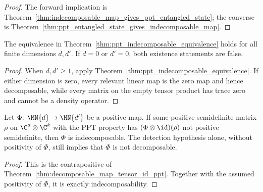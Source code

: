\begin{proof}
    \leanok
    The forward implication is
    Theorem~\ref{thm:indecomposable_map_gives_ppt_entangled_state}; the
    converse is
    Theorem~\ref{thm:ppt_entangled_state_gives_indecomposable_map}.
\end{proof}

\begin{theorem}
    \label{thm:ppt_indecomposable_equivalence_all_dimensions}
    \leanok
    The equivalence in
    Theorem~\ref{thm:ppt_indecomposable_equivalence} holds for all finite
    dimensions $d,d'$. If $d=0$ or $d'=0$, both existence statements are
    false.
\end{theorem}

\begin{proof}
    \leanok
    When $d,d'\geq1$, apply
    Theorem~\ref{thm:ppt_indecomposable_equivalence}. If either dimension is
    zero, every relevant linear map is the zero map and hence decomposable,
    while every matrix on the empty tensor product has trace zero and cannot
    be a density operator.
\end{proof}

\begin{theorem}
    \label{thm:indecomposable_of_ppt_witness}
    \leanok
    Let $\Phi\colon\MN{d}\to\MN{d'}$ be a positive map. If some positive
    semidefinite matrix $\rho$ on $\C^{d}\otimes\C^{k}$ with the PPT property
    has $(\Phi\otimes\id)(\rho)$ not positive semidefinite, then $\Phi$ is
    indecomposable. The detection hypothesis alone, without positivity of
    $\Phi$, still implies that $\Phi$ is not decomposable.
\end{theorem}

\begin{proof}
    \leanok
    This is the contrapositive of
    Theorem~\ref{thm:decomposable_map_tensor_id_ppt}. Together with the assumed
    positivity of $\Phi$, it is exactly indecomposability.
\end{proof}
